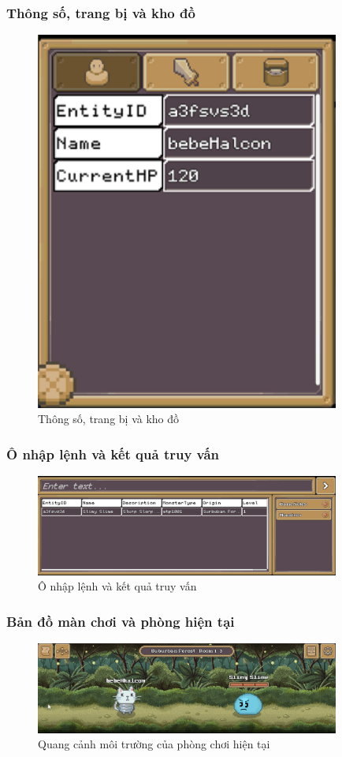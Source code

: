 \subsubsection{Thông số, trang bị và kho đồ}
\begin{figure}[H]
	\centering
	\includegraphics[width=10cm]{Images/Inventory.png}
	\vspace{0.5cm}
	\caption{Thông số, trang bị và kho đồ}
\end{figure}
\subsubsection{Ô nhập lệnh và kết quả truy vấn}
\begin{figure}[H]
	\centering
	\includegraphics[width=10cm]{Images/CommandBox.png}
	\vspace{0.5cm}
	\caption{Ô nhập lệnh và kết quả truy vấn}
\end{figure}
\subsubsection{Bản đồ màn chơi và phòng hiện tại}
\begin{figure}[H]
	\centering
	\includegraphics[width=10cm]{Images/CurrentRoom.png}
	\vspace{0.5cm}
	\caption{Quang cảnh môi trường của phòng chơi hiện tại}
\end{figure}